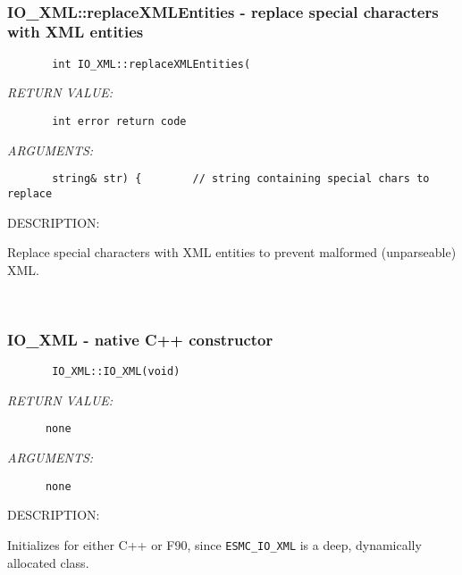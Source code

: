 
\mbox{}\hrulefill\ 
 
\subsubsection [IO\_XML::replaceXMLEntities] {IO\_XML::replaceXMLEntities - replace special characters with XML entities}


  
\begin{verbatim}       int IO_XML::replaceXMLEntities(\end{verbatim}{\em RETURN VALUE:}
\begin{verbatim}       int error return code\end{verbatim}{\em ARGUMENTS:}
\begin{verbatim}       string& str) {        // string containing special chars to replace
 \end{verbatim}
{\sf DESCRIPTION:\\ }


      Replace special characters with XML entities to prevent 
      malformed (unparseable) XML.
   
 
\mbox{}\hrulefill\ 
 
\subsubsection [IO\_XML] {IO\_XML - native C++ constructor}


  
\begin{verbatim}       IO_XML::IO_XML(void)\end{verbatim}{\em RETURN VALUE:}
\begin{verbatim}      none\end{verbatim}{\em ARGUMENTS:}
\begin{verbatim}      none\end{verbatim}
{\sf DESCRIPTION:\\ }


        Initializes for either C++ or F90, since {\tt ESMC\_IO\_XML} is a deep,
        dynamically allocated class.
   
 
\mbox{}\hrulefill\ 
 
